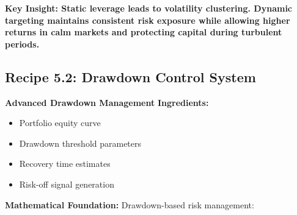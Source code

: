 \documentclass[11pt,letterpaper,openany]{book}
\begin{document}
\textbf{Key Insight: Static leverage leads to volatility clustering. Dynamic targeting maintains consistent risk exposure while allowing higher returns in calm markets and protecting capital during turbulent periods.}

\subsection{Recipe 5.2: Drawdown Control System}

\textbf{Advanced Drawdown Management}
\textbf{Ingredients:}
\begin{itemize}
    \item Portfolio equity curve
    \item Drawdown threshold parameters
    \item Recovery time estimates
    \item Risk-off signal generation
\end{itemize}
\textbf{Mathematical Foundation:}
Drawdown-based risk management:
\end{document}
